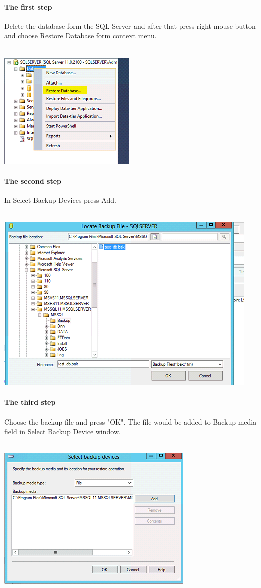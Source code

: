 \documentclass[english]{article}
\begin{document}
\paragraph{The first step} Delete the database form the SQL Server and after that press right mouse button and choose Restore Database form context menu. \\\\
\centerline{\includegraphics[scale=0.8]{administration/5}}
\paragraph{The second step} In Select Backup Devices press Add.\\\\
\centerline{\includegraphics[scale=1]{administration/6}}
\paragraph{The third step} Choose the backup file and press "OK". The file would be added to Backup media field in Select Backup Device window.\\\\
\centerline{\includegraphics[scale=1]{administration/7}}
\end{document}
